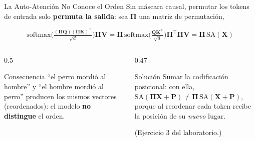 \documentclass[aspectratio=169, 10pt]{beamer}
\newcommand{\softmax}{\mathrm{softmax}}
\newcommand{\formula}[1]{%
	\begin{tcolorbox}[colback=UCMBlue!8, colframe=UCMBlue, arc=4pt,
		boxsep=2pt, left=6pt, right=6pt, top=3pt, bottom=3pt]
		#1
	\end{tcolorbox}
}
\begin{document}
\begin{frame}{La Auto-Atenci\'on No Conoce el Orden}
	Sin m\'ascara causal, permutar los tokens de entrada solo \textbf{permuta la salida}: sea $\boldsymbol{\Pi}$ una matriz de permutaci\'on,
	\formula{
		\small
		\[
		\softmax\!\Big(\tfrac{(\boldsymbol\Pi\mathbf{Q})(\boldsymbol\Pi\mathbf{K})^\top}{\sqrt d}\Big)\boldsymbol\Pi\mathbf{V}
		=\boldsymbol\Pi\,\softmax\!\Big(\tfrac{\mathbf{Q}\mathbf{K}^\top}{\sqrt d}\Big)\boldsymbol\Pi^\top\boldsymbol\Pi\mathbf{V}
		=\boldsymbol\Pi\,\mathrm{SA}(\mathbf{X})
		\]
	}
	\vspace{-0.2cm}
	\begin{columns}[T]
		\begin{column}{0.5\textwidth}
			\begin{alertblock}{Consecuencia}
				\small
				``el perro mordi\'o al hombre'' y ``el hombre mordi\'o al perro'' producen los mismos vectores (reordenados): el modelo \textbf{no distingue} el orden.
			\end{alertblock}
		\end{column}
		\begin{column}{0.47\textwidth}
			\begin{block}{Soluci\'on}
				\small
				Sumar la codificaci\'on posicional: con ella, $\mathrm{SA}(\boldsymbol\Pi\mathbf{X}+\mathbf{P})\neq\boldsymbol\Pi\,\mathrm{SA}(\mathbf{X}+\mathbf{P})$, porque al reordenar cada token recibe la posici\'on de su \emph{nuevo} lugar.
				\smallskip

				(Ejercicio 3 del laboratorio.)
			\end{block}
		\end{column}
	\end{columns}
\end{frame}
\end{document}
